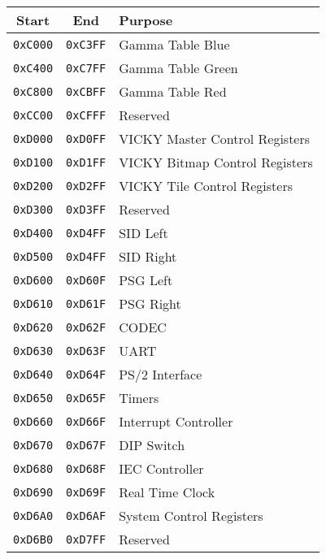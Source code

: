 \begin{table}
    \begin{center}
        \begin{tabular}{|c|c|l|} \hline
            Start & End & Purpose \\ \hline \hline
            \verb+0xC000+ & \verb+0xC3FF+ & Gamma Table Blue \\ \hline
            \verb+0xC400+ & \verb+0xC7FF+ & Gamma Table Green \\ \hline
            \verb+0xC800+ & \verb+0xCBFF+ & Gamma Table Red \\ \hline
            \verb+0xCC00+ & \verb+0xCFFF+ & Reserved \\ \hline
            \verb+0xD000+ & \verb+0xD0FF+ & VICKY Master Control Registers \\ \hline
            \verb+0xD100+ & \verb+0xD1FF+ & VICKY Bitmap Control Registers \\ \hline
            \verb+0xD200+ & \verb+0xD2FF+ & VICKY Tile Control Registers \\ \hline
            \verb+0xD300+ & \verb+0xD3FF+ & Reserved \\ \hline
            \verb+0xD400+ & \verb+0xD4FF+ & SID Left \\ \hline
            \verb+0xD500+ & \verb+0xD4FF+ & SID Right \\ \hline
            \verb+0xD600+ & \verb+0xD60F+ & PSG Left \\ \hline
            \verb+0xD610+ & \verb+0xD61F+ & PSG Right \\ \hline
            \verb+0xD620+ & \verb+0xD62F+ & CODEC \\ \hline
            \verb+0xD630+ & \verb+0xD63F+ & UART \\ \hline
            \verb+0xD640+ & \verb+0xD64F+ & PS/2 Interface \\ \hline
            \verb+0xD650+ & \verb+0xD65F+ & Timers \\ \hline
            \verb+0xD660+ & \verb+0xD66F+ & Interrupt Controller \\ \hline
            \verb+0xD670+ & \verb+0xD67F+ & DIP Switch \\ \hline
            \verb+0xD680+ & \verb+0xD68F+ & IEC Controller \\ \hline
            \verb+0xD690+ & \verb+0xD69F+ & Real Time Clock \\ \hline
            \verb+0xD6A0+ & \verb+0xD6AF+ & System Control Registers \\ \hline
            \verb+0xD6B0+ & \verb+0xD7FF+ & Reserved \\ \hline

\end{tabular}
\end{center}
\end{table}
